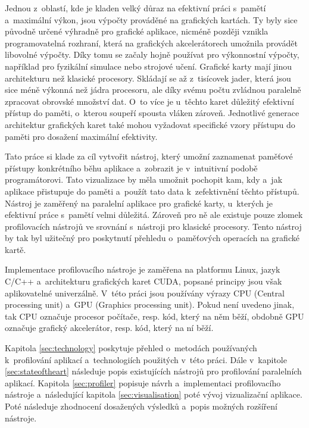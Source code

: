 Jednou z~oblastí, kde je kladen velký důraz na efektivní práci s~pamětí a~maximální výkon, jsou výpočty prováděné na grafických kartách. Ty byly sice původně určené výhradně pro grafické aplikace, nicméně později vznikla programovatelná rozhraní, která na grafických akcelerátorech umožnila provádět libovolné výpočty. Díky tomu se začaly hojně používat pro výkonnostní výpočty, například pro fyzikální simulace nebo strojové učení. Grafické karty mají jinou architekturu než klasické procesory. Skládají se až z~tisícovek jader, která jsou sice méně výkonná než jádra procesoru, ale díky svému počtu zvládnou paralelně zpracovat obrovské množství dat. O~to více je u~těchto karet důležitý efektivní přístup do paměti, o~kterou soupeří spousta vláken zároveň. Jednotlivé generace architektur grafických karet také mohou vyžadovat specifické vzory přístupu do paměti pro dosažení maximální efektivity.

Tato práce si klade za cíl vytvořit nástroj, který umožní zaznamenat paměťové přístupy konkrétního běhu aplikace a~zobrazit je v~intuitivní podobě programátorovi. Tato vizualizace by měla umožnit pochopit kam, kdy a~jak aplikace přistupuje do paměti a~použít tato data k~zefektivnění těchto přístupů. Nástroj je zaměřený na paralelní aplikace pro grafické karty, u~kterých je efektivní práce s~pamětí velmi důležitá. Zároveň pro ně ale existuje pouze zlomek profilovacích nástrojů ve srovnání s~nástroji pro klasické procesory. Tento nástroj by tak byl užitečný pro poskytnutí přehledu o~paměťových operacích na grafické kartě.

Implementace profilovacího nástroje je zaměřena na platformu Linux, jazyk C/C++ a~architekturu grafických karet CUDA, popsané principy jsou však aplikovatelné univerzálně. V~této práci jsou používány výrazy CPU (Central processing unit) a~GPU (Graphics processing unit). Pokud není uvedeno jinak, tak CPU označuje procesor počítače, resp. kód, který na něm běží, obdobně GPU označuje grafický akcelerátor, resp. kód, který na ní běží.

Kapitola \ref{sec:technology} poskytuje přehled o~metodách používaných k~profilování aplikací a~technologiích použitých v~této práci. Dále v~kapitole \ref{sec:stateoftheart} následuje popis existujících nástrojů pro profilování paralelních aplikací. Kapitola \ref{sec:profiler} popisuje návrh a~implementaci profilovacího nástroje a~následující kapitola \ref{sec:visualisation} poté vývoj vizualizační aplikace. Poté následuje zhodnocení dosažených výsledků a~popis možných rozšíření nástroje. 
